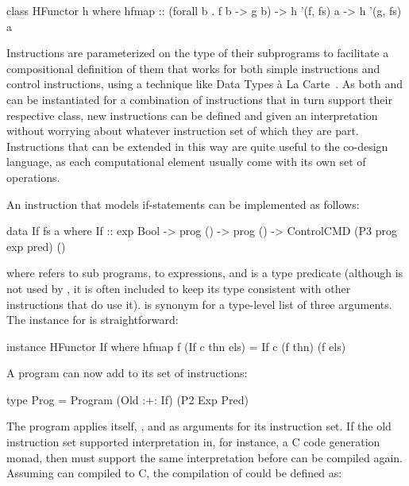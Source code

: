\documentclass[../paper.tex]{subfiles}
\begin{document}
\begin{code}
class HFunctor h where
  hfmap :: (forall b . f b -> g b) -> h '(f, fs) a -> h '(g, fs) a
\end{code}

Instructions are parameterized on the type of their subprograms to facilitate a compositional definition of them that works for both simple instructions and control instructions, using a technique like Data Types \`{a} La Carte~\cite{DTC}. As both  and  can be instantiated for a combination of instructions that in turn support their respective class, new instructions can be defined and given an interpretation without worrying about whatever instruction set of which they are part. Instructions that can be extended in this way are quite useful to the co-design language, as each computational element usually come with its own set of operations.

An instruction that models if-statements can be implemented as follows:

\begin{code}
data If fs a where
  If :: exp Bool -> prog () -> prog () -> ControlCMD (P3 prog exp pred) ()
\end{code}

\noindent where  refers to sub programs,  to expressions, and  is a type predicate (although  is not used by , it is often included to keep its type consistent with other instructions that do use it).  is synonym for a type-level list of three arguments. The  instance for  is straightforward:

\begin{code}
instance HFunctor If where
  hfmap f (If c thn els) = If c (f thn) (f els)
\end{code}

A program can now add  to its set of instructions:

\begin{code}
type Prog = Program (Old :+: If) (P2 Exp Pred)
\end{code}

\noindent The program applies itself, , and  as arguments for its instruction set. If the old instruction set supported interpretation in, for instance, a C code generation monad, then  must support the same interpretation before  can be compiled again. Assuming  can compiled to C, the compilation of  could be defined as:
\end{document}
